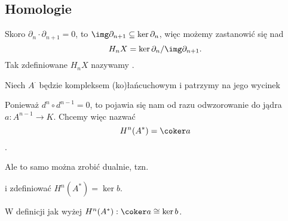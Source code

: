 \subsection{Homologie}

Skoro $\partial_n\cdot\partial_{n+1}=0$, to $\img\partial_{n+1}\subseteq\ker\partial_n$, więc możemy zastanowić się nad
  $$H_nX=\ker\partial_n/\img\partial_{n+1}.$$
Tak zdefiniowane $H_nX$ nazywamy .

\begin{definition}
  Niech $A^\cdot$ będzie kompleksem (ko)łańcuchowym i patrzymy na jego wycinek
  \begin{center}\end{center}
  Ponieważ $d^n\circ d^{n-1}=0$, to pojawia się nam od razu odwzorowanie do jądra $a:A^{n-1}\to K$. Chcemy więc nazwać
  $$H^n(A^*)=\coker a$$
  .
\end{definition}

  Ale to samo można zrobić dualnie, tzn.

  \begin{center}\end{center}
  i zdefiniować $H^n(A^*)=\ker b$.


\begin{lemma}
  W definicji jak wyżej $H^n(A^*):\coker a\cong\ker b$.
\end{lemma}

